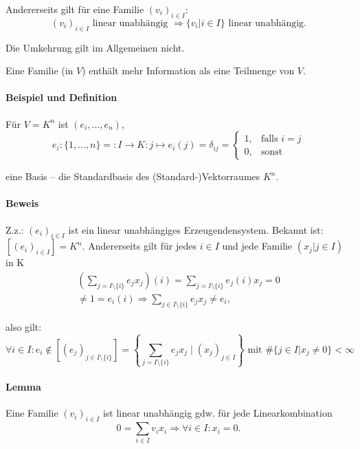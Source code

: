 	Andererseits gilt für eine Familie $(v_i)_{i\in I} $:
	\begin{equation*}
		(v_i)_{i\in I} \text{ linear unabhängig } \Rightarrow \{v_i| i\in I\} \text{ linear unabhängig.}
	\end{equation*}
	
	Die Umkehrung gilt im Allgemeinen nicht.

	Eine Familie (in $ V $) enthält mehr Information als eine Teilmenge von $ V $.
	
\paragraph{Beispiel und Definition}
	Für $V = K^n$ ist $(e_i, ... , e_n)$,
	\begin{equation*}
		e_i:\{{1, ... ,n\}} =: I\to K: j\mapsto e_i(j)= \delta_{ij}=
		\begin{cases}
			1,& \text{falls } i=j\\
			0,& \text{sonst}
		\end{cases}
	\end{equation*}

	eine Basis -- die Standardbasis des (Standard-)Vektorraumes $K^n$.

\paragraph{Beweis}
	Z.z.: $ (e_i)_{i\in I} $ ist ein linear unabhängiges Erzeugendensystem. Bekannt ist: $ [(e_i)_{i\in I}] = K^n $. Andererseits gilt für jedes $i\in I$ und jede Familie $(x_j| j\in I)$ in K
	\begin{align*}
		\left(\sum_{j= I\setminus\{i\}}e_jx_j\right)(i) = \sum_{j=I\setminus\{i\}}e_j(i)x_j = 0\\
		\neq 1 = e_i(i) \Rightarrow \sum_{j\in I\setminus\{i\}} e_jx_j \neq e_i,
	\end{align*}
	
	also gilt:
	\begin{equation*}
		\forall i\in I: e_i \notin [(e_j)_{j\in I\setminus\{i\}}] = \left\{\sum_{j=I\setminus\{i\}} e_jx_j\mid (x_j)_{ j\in I}\right\} \text{ mit } \#\{j\in I| x_j \neq 0\}<\infty
	\end{equation*}
	
\paragraph{Lemma}
	Eine Familie $(v_i)_{i\in I}$ ist linear unabhängig gdw. für jede Linearkombination
	\begin{equation*}
		0 = \sum_{i\in I} v_ix_i \Rightarrow \forall i\in I: x_i = 0.
	\end{equation*}

